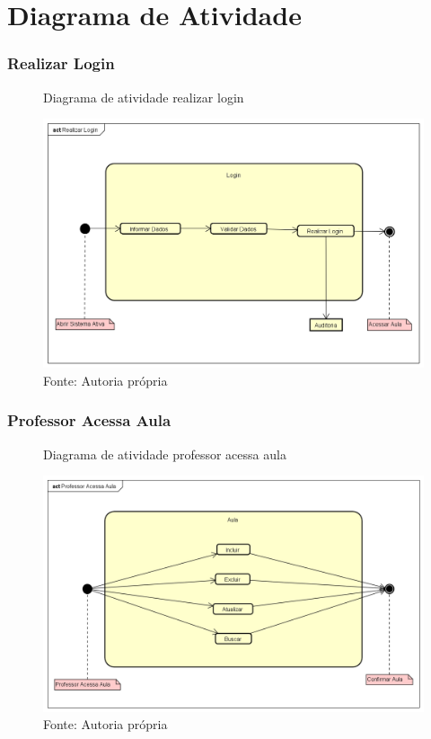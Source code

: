 \documentclass{utfpr-pg}
\begin{document}
\chapter{Diagrama de Atividade}
\subsection{Realizar Login}
        \begin{figure}[H]
            \centering
            \captionsetup{width=\textwidth}
            \caption{Diagrama de atividade realizar login}
            \includegraphics[width=\linewidth]{fotos/atv1.png}
            \caption*{Fonte: Autoria própria}
            \label{fig:Diagrama de Classes}
        \end{figure}
\subsection{Professor Acessa Aula}
        \begin{figure}[H]
            \centering
            \captionsetup{width=\textwidth}
            \caption{Diagrama de atividade professor acessa aula}
            \includegraphics[width=\linewidth]{fotos/atv2.png}
            \caption*{Fonte: Autoria própria}
            \label{fig:Diagrama de Classes}
        \end{figure}
\end{document}
